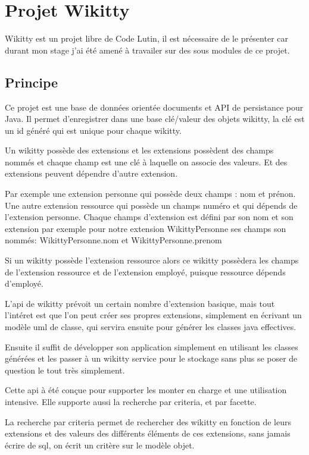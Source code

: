 \section{Projet Wikitty}

Wikitty est un projet libre de Code Lutin, il est nécessaire de le présenter car
durant mon stage j'ai été amené à travailer sur des sous modules de ce projet.

\subsection{Principe}

Ce projet est une base de données orientée documents et API de persistance pour
Java. Il permet d'enregistrer dans une base clé/valeur des objets wikitty, la
clé est un id généré qui est unique pour chaque wikitty. 

Un wikitty possède des extensions et les extensions possèdent des champs nommés
et chaque champ est une clé à laquelle on associe des valeurs. Et des extensions
peuvent dépendre d'autre extension.

Par exemple une extension personne qui possède deux champs : nom et prénon.
Une autre extension ressource qui possède un champs numéro et qui dépends de
l'extension personne. Chaque champs d'extension est défini par son nom et son 
extension par exemple pour notre extension WikittyPersonne ses champs son nommés:
WikittyPersonne.nom et WikittyPersonne.prenom

Si un wikitty possède l'extension ressource alors ce wikitty possèdera les
champs de l'extension ressource et de l'extension employé, puisque ressource
dépends d'employé.

L'api de wikitty prévoit un certain nombre d'extension basique, mais tout
l'intéret est que l'on peut créer ses propres extensions, simplement en écrivant
un modèle uml de classe, qui servira ensuite pour générer les classes java
effectives.

Ensuite il suffit de développer son application simplement en utilisant les
classes générées et les passer à un wikitty service pour le stockage sans plus
se poser de question le tout très simplement.

Cette api à été conçue pour supporter les monter en charge et une utilisation
intensive. Elle supporte aussi la recherche par criteria, et par facette.

La recherche par criteria permet de rechercher des wikitty en fonction de leurs
extensions et des valeurs des différents éléments de ces extensions, sans jamais
écrire de sql, on écrit un critère sur le modèle objet. 

